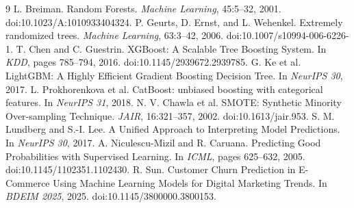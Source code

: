 \documentclass[11pt]{article}
\begin{document}
\begin{thebibliography}{9}
 L. Breiman. Random Forests. \emph{Machine Learning}, 45:5--32, 2001. doi:10.1023/A:1010933404324.
 P. Geurts, D. Ernst, and L. Wehenkel. Extremely randomized trees. \emph{Machine Learning}, 63:3--42, 2006. doi:10.1007/s10994-006-6226-1.
 T. Chen and C. Guestrin. XGBoost: A Scalable Tree Boosting System. In \emph{KDD}, pages 785--794, 2016. doi:10.1145/2939672.2939785.
 G. Ke et al. LightGBM: A Highly Efficient Gradient Boosting Decision Tree. In \emph{NeurIPS 30}, 2017.
 L. Prokhorenkova et al. CatBoost: unbiased boosting with categorical features. In \emph{NeurIPS 31}, 2018.
 N. V. Chawla et al. SMOTE: Synthetic Minority Over-sampling Technique. \emph{JAIR}, 16:321--357, 2002. doi:10.1613/jair.953.
 S. M. Lundberg and S.-I. Lee. A Unified Approach to Interpreting Model Predictions. In \emph{NeurIPS 30}, 2017.
 A. Niculescu-Mizil and R. Caruana. Predicting Good Probabilities with Supervised Learning. In \emph{ICML}, pages 625--632, 2005. doi:10.1145/1102351.1102430.
 R. Sun. Customer Churn Prediction in E-Commerce Using Machine Learning Models for Digital Marketing Trends. In \emph{BDEIM 2025}, 2025. doi:10.1145/3800000.3800153.
\end{thebibliography}
\end{document}

